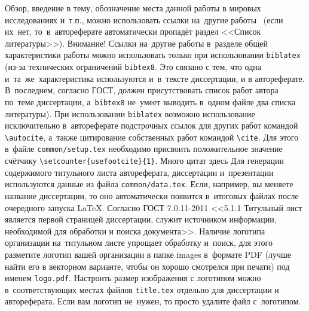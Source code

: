 
{\actuality} Обзор, введение в тему, обозначение места данной работы в
мировых исследованиях и~т.\:п., можно использовать ссылки на~другие
работы~\autocite{lomonosov_sobranie_1950,abraham_gromacs:_2015}
(если их~нет, то~в~автореферате
автоматически пропадёт раздел <<Список литературы>>)\cite{armeev_linking_2019}. Внимание! Ссылки
на~другие работы в~разделе общей характеристики работы можно
использовать только при использовании \verb!biblatex! (из-за технических
ограничений \verb!bibtex8!. Это связано с тем, что одна
и~та~же~характеристика используются и~в~тексте диссертации, и в
автореферате. В~последнем, согласно ГОСТ, должен присутствовать список
работ автора по~теме диссертации, а~\verb!bibtex8! не~умеет выводить в~одном
файле два списка литературы).
При использовании \verb!biblatex! возможно использование исключительно
в~автореферате подстрочных ссылок
для других работ командой \verb!\autocite!, а~также цитирование
собственных работ командой \verb!\cite!. Для этого в~файле
\verb!common/setup.tex! необходимо присвоить положительное значение
счётчику \verb!\setcounter{usefootcite}{1}!.
Много цитат здесь \cite{abraham_gromacs:_2015,adamcik_understanding_2010,adhikari_chromosome3d:_2016,adhireksan_allosteric_2017,adilakshmi_hydroxyl_2006,adkins_nucleosome_2013,aggeli_hierarchical_2001,akcelrud_electroluminescent_2003,alder_molecular_1958,alder_phase_1957,alemdaroglu_dna_2007,allen_computer_1989,allen_computer_2002,allinger_molecular_1989,ammar_chromatin_2012,anders_nucleosome_2014,andersen_molecular_1980,angelov_preferential_2001,antolini_polymorphism_1998,apetri_secondary_2006,armache_cryo-em_2019,arnold_naturally_2012,arosio_ordered_2009,arya_role_2006,atkins_atkins_2006,aucagne_chemoselective_2006,author_english_1947,azumi_coincidence_2000,babcock_nucleic_1994,baek_design_2000,baker_genetic_2005,balasubramanian_dna_1998,balbach_supramolecular_2002,baldwin_cytochrome_2006,balzani_electron_2001,bancaud_structural_2006,bao_nucleosome_2006,bashkin_structure_1993,bauerle_specific_1998,skotheim_one-dimensional_2007}
Для генерации содержимого титульного листа автореферата, диссертации
и~презентации используются данные из файла \verb!common/data.tex!. Если,
например, вы меняете название диссертации, то оно автоматически
появится в~итоговых файлах после очередного запуска \LaTeX. Согласно
ГОСТ 7.0.11-2011 <<5.1.1 Титульный лист является первой страницей
диссертации, служит источником информации, необходимой для обработки и
поиска документа>>. Наличие логотипа организации на~титульном листе
упрощает обработку и~поиск, для этого разметите логотип вашей
организации в папке images в~формате PDF (лучше найти его в векторном
варианте, чтобы он хорошо смотрелся при печати) под именем
\verb!logo.pdf!. Настроить размер изображения с логотипом можно
в~соответствующих местах файлов \verb!title.tex!  отдельно для
диссертации и автореферата. Если вам логотип не~нужен, то просто
удалите файл с~логотипом.


